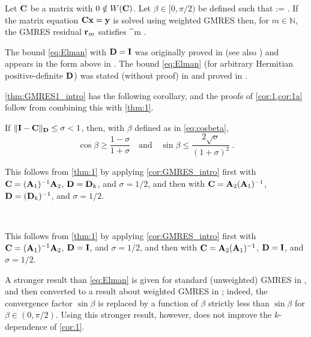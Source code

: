 
\begin{theorem}\label{thm:GMRES1_intro} 
Let $\mathbf{C}$ be a matrix with $0\notin W(\mathbf{C})$. Let $\beta\in[0,\pi/2)$ be defined such that
\beq\label{eq:cosbeta}
\cos \beta := .
\eeq
If the matrix equation $\mathbf{C} \mathbf{x} = \mathbf{y}$ is solved using weighted GMRES then, 
for $m\in \mathbb{N}$, the GMRES residual $\mathbf{r}_m$ %
satisfies
\beq\label{eq:Elman}
 \leq \sin^m \beta. %
\eeq
\end{theorem}
The bound \cref{eq:Elman} with $\mathbf{D}=\mathbf{I}$ was originally proved in \cite{El:82} (see also \cite[Theorem 3.3]{EiElSc:83}) and appears in the form above in \cite[Equation 1.2]{BeGoTy:06}. The bound \cref{eq:Elman} (for arbitrary Hermitian positive-definite $\mathbf{D}$) was stated (without proof) in \cite{CaWi:92} and proved in \cite[Theorem 5.1]{GrSpVa:17}. %



\cref{thm:GMRES1_intro} has the following corollary, and the proofs of \cref{cor:1,cor:1a} follow from combining this with \cref{thm:1}.

\begin{corollary}
\label{cor:GMRES_intro} 
If $\|\mathbf{I} - \mathbf{C} \|_{\mathbf{D}} \leq \sigma < 1$, then, with $\beta$ defined as in \cref{eq:cosbeta},
$$\cos \beta \geq \frac{1-\sigma}{1+\sigma} \quad \text{and} \quad
\sin \beta \leq \frac{2 \sqrt{\sigma}}{(1+\sigma)^2} \ . $$
\end{corollary}

This follows from \cref{thm:1} by applying \cref{cor:GMRES_intro} first with $\mathbf{C}= (\mathbf{A}_{1})^{-1} \mathbf{A}_{2}$, $\mathbf{D}=\mathbf{D}_k$, and $\sigma=1/2$, and then with $\mathbf{C}= \mathbf{A}_{2}(\mathbf{A}_{1})^{-1} $, $\mathbf{D}=(\mathbf{D}_k)^{-1}$, and $\sigma=1/2$.
\epf

\

This follows from \cref{thm:1} by applying \cref{cor:GMRES_intro} first with $\mathbf{C}= (\mathbf{A}_{1})^{-1} \mathbf{A}_{2}$, $\mathbf{D}=\mathbf{I}$, and $\sigma=1/2$, and then with $\mathbf{C}= \mathbf{A}_{2}(\mathbf{A}_{1})^{-1} $, $\mathbf{D}=\mathbf{I}$, and $\sigma=1/2$.
\epf


A stronger result than \cref{eq:Elman} is given for standard (unweighted) GMRES in \cite[Theorem 2.1]{BeGoTy:06}, and then converted to a result about weighted GMRES in \cite[Theorem 5.3]{BoDoGrSpTo:19}; indeed, the convergence factor $\sin \beta$ is replaced by a function of $\beta$ strictly less than $\sin\beta$ for $\beta\in (0,\pi/2)$. Using this stronger result, however, does not improve the $k$-dependence of \cref{cor:1}.
\ere


